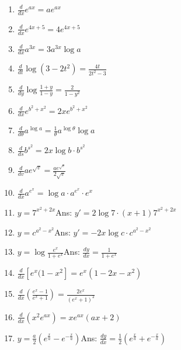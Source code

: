 \begin{enumerate}
\item
$\frac{d}{dx} e^{ax} = ae^{ax}$

\item
$\frac{d}{dx} e^{4x + 5} = 4e^{4x + 5}$

\item
$\frac{d}{dx} a^{3x} = 3a^{3x} \log a$

\item
$\frac{d}{dt} \log(3 - 2t^2) = \frac{4t}{2t^2 - 3}$

\item
$\frac{d}{dy} \log \frac{1 + y}{1 - y} = \frac{2}{1 - y^2}$

\item
$\frac{d}{dx}e^{b^2 + x^2} = 2xe^{b^2 + x^2}$

\item
$\frac{d}{d\theta} a^{\log a} = \frac{1}{\theta} a^{\log \theta} \log a$

\item
$\frac{d}{ds}b^{s^2} = 2x \log b \cdot b^{s^2}$

\item
$\frac{d}{dv} ae^{\sqrt{v}} = \frac{ae^{\sqrt{v}}}{2\sqrt{v}}$

\item
$\frac{d}{dx} a^{e^x} = \log a \cdot a^{e^x} \cdot e^x$

\item
$y = 7^{x^2 + 2x}$\qquad\qquad\qquad\qquad\qquad\qquad Ans: 	$y' = 2\log 7 \cdot (x + 1) 7^{x^2 + 2x}$

\item
$y = c^{a^2 - x^2}$\qquad\qquad\qquad\qquad\qquad\qquad Ans: 	$y' = -2x \log c \cdot c^{a^2 - x^2}$

\item
$y = \log \frac{e^x}{1 + e^x}$\qquad\qquad\qquad\qquad\qquad\qquad Ans: 	$\frac{dy}{dx} = \frac{1}{1 + e^x}$

\item
$\frac{d}{dx} \left [ e^x ( 1- x^2 \right ] = e^x (1 - 2x - x^2)$

\item
$\frac{d}{dx} \left ( \frac{e^x - 1}{e^x + 1} \right ) = \frac{2e^x}{(e^x + 1)^2}$

\item
$\frac{d}{dx} \left ( x^2 e^{ax} \right ) = xe^{ax}(ax + 2)$

\item
$y = \frac{a}{2} (e^{\frac{x}{a}} - e^{-\frac{x}{a}})$\qquad\qquad\qquad\qquad\qquad\qquad Ans: 	
$\frac{dy}{dx} = \frac{1}{2} (e^{\frac{x}{a}} + e^{-\frac{x}{a}})$


\end{enumerate}
